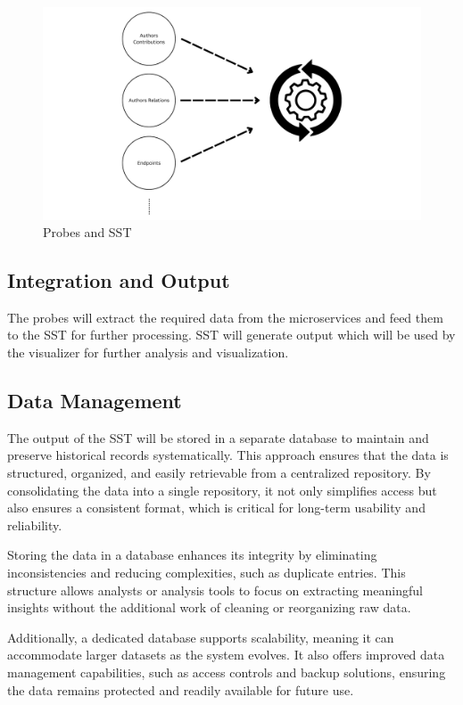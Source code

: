 \begin{figure}[H]
    \centering
    \includegraphics[width=1\textwidth]{figures/sst_working.png}
    \caption[Probes and SST]{Probes and SST}
    \label{fig_probes_sst}
\end{figure}

\subsection{Integration and Output}

The probes will extract the required data from the microservices and feed them to the SST for further processing. SST will generate output which will be used by the visualizer for further analysis and visualization.

\subsection{Data Management}

The output of the SST will be stored in a separate database to maintain and preserve historical records systematically. This approach ensures that the data is structured, organized, and easily retrievable from a centralized repository. By consolidating the data into a single repository, it not only simplifies access but also ensures a consistent format, which is critical for long-term usability and reliability. 

Storing the data in a database enhances its integrity by eliminating inconsistencies and reducing complexities, such as duplicate entries. This structure allows analysts or analysis tools to focus on extracting meaningful insights without the additional work of cleaning or reorganizing raw data.

Additionally, a dedicated database supports scalability, meaning it can accommodate larger datasets as the system evolves. It also offers improved data management capabilities, such as access controls and backup solutions, ensuring the data remains protected and readily available for future use.

